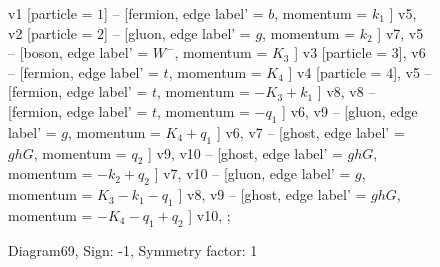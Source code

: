 \documentclass{revtex4}
\begin{document}
\begin{figure}[!htb]
\begin{center}
{    %
v1 [particle = \(1\)] -- [fermion, edge label' = \(b\), momentum = \(k_{1}\) ] v5, 
v2 [particle = \(2\)] -- [gluon, edge label' = \(g\), momentum = \(k_{2}\) ] v7, 
v5 -- [boson, edge label' = \(W^{-}\), momentum = \(K_{3}\) ] v3 [particle = \(3\)], 
v6 -- [fermion, edge label' = \(t\), momentum = \(K_{4}\) ] v4 [particle = \(4\)], 
v5 -- [fermion, edge label' = \(t\), momentum = \(-K_{3} + k_{1}\) ] v8, 
v8 -- [fermion, edge label' = \(t\), momentum = \(-q_{1}\) ] v6, 
v9 -- [gluon, edge label' = \(g\), momentum = \(K_{4} + q_{1}\) ] v6, 
v7 -- [ghost, edge label' = \(ghG\), momentum = \(q_{2}\) ] v9, 
v10 -- [ghost, edge label' = \(ghG\), momentum = \(-k_{2} + q_{2}\) ] v7, 
v10 -- [gluon, edge label' = \(g\), momentum = \(K_{3} - k_{1} - q_{1}\) ] v8, 
v9 -- [ghost, edge label' = \(ghG\), momentum = \(-K_{4} - q_{1} + q_{2}\) ] v10, 
};
\end{center}
\caption{Diagram69, Sign: -1, Symmetry factor: 1}
\end{figure}
\newpage
\end{document}
